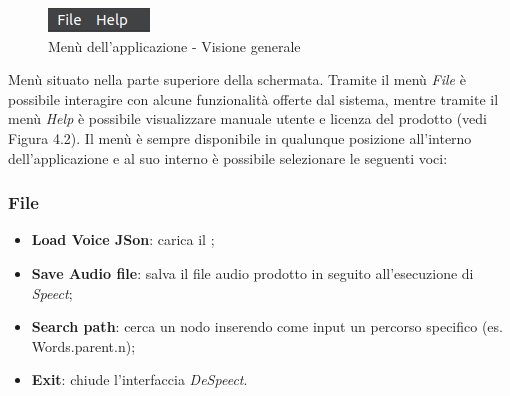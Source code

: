 \documentclass[openany,12pt,a4paper]{report}
\begin{document}
 	\begin{figure}[H]
 		
 		\centering
 		
 		\includegraphics{./img/menu}
 		
 		\caption{Menù dell'applicazione - Visione generale}
 		
 	\end{figure}
 
 	Menù situato nella parte superiore della schermata. Tramite il menù \textit{File} è possibile interagire con alcune funzionalità offerte dal sistema, mentre tramite il menù \textit{Help} è possibile visualizzare manuale utente e licenza del prodotto (vedi Figura 4.2). Il menù è sempre disponibile in qualunque posizione all'interno dell'applicazione e al suo interno è possibile selezionare le seguenti voci:
 	
 	\newpage
 	
 	\subsubsection{File} 
 		\begin{itemize}
 			\item \textbf{Load Voice JSon}: carica il  ;
 			\item \textbf{Save Audio file}: salva il file audio prodotto in seguito all'esecuzione di \textit{Speect};
 			\item \textbf{Search path}: cerca un nodo inserendo come input un percorso specifico (es. Words.parent.n);
 			\item \textbf{Exit}: chiude l'interfaccia \textit{DeSpeect}.
 		\end{itemize}
 		
\end{document}

